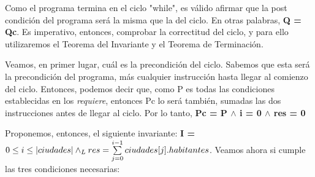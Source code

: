 \documentclass[10pt,a4paper]{article}
\begin{document}
Como el programa termina en el ciclo "while", es válido afirmar que la post condición del programa será la misma que la del ciclo. En otras palabras, \textbf{Q = Qc}. Es imperativo, entonces, comprobar la correctitud del ciclo, y para ello utilizaremos el Teorema del Invariante y el Teorema de Terminación.

Veamos, en primer lugar, cuál es la precondición del ciclo. Sabemos que esta será la precondición del programa, más cualquier instrucción hasta llegar al comienzo del ciclo. Entonces, podemos decir que, como P es todas las condiciones establecidas en los \textit{requiere}, entonces Pc lo será también, sumadas las dos instrucciones antes de llegar al ciclo. Por lo tanto, \textbf{Pc = P $\wedge$ i = 0 $\wedge$ res = 0}

Proponemos, entonces, el siguiente invariante: \textbf{I = $0 \leq i \leq |ciudades| \land _L res = \sum\limits_{j=0}^{i - 1}ciudades[j].habitantes$}. Veamos ahora si cumple las tres condiciones necesarias: 
\end{document}
